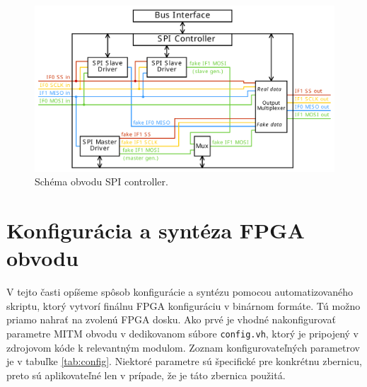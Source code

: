 \begin{figure}
    \centerline{\includegraphics[width=1\textwidth]{images/designs/spiController.pdf}}
    \caption[Schéma obvodu SPI controller]{Schéma obvodu SPI controller.}
    \label{obr:spiController}
\end{figure}

\section{Konfigurácia a syntéza FPGA obvodu} \label{sek:config}
V tejto časti opíšeme spôsob konfigurácie a syntézu pomocou automatizovaného skriptu, ktorý vytvorí finálnu FPGA konfiguráciu v binárnom formáte. Tú možno priamo nahrať na zvolenú FPGA dosku. Ako prvé je vhodné nakonfigurovať parametre MITM obvodu v dedikovanom súbore \texttt{config.vh}, ktorý je pripojený v zdrojovom kóde k relevantným modulom. Zoznam konfigurovateľných parametrov je v tabuľke \ref{tab:config}. Niektoré parametre sú špecifické pre konkrétnu zbernicu, preto sú aplikovateľné len v prípade, že je táto zbernica použitá.


